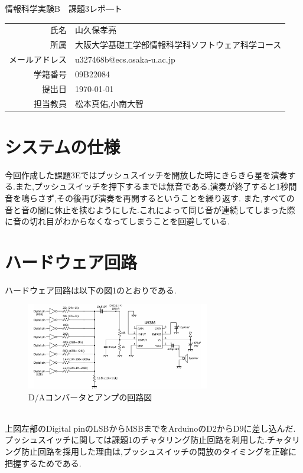 \documentclass[dvipdfmx]{jarticle}
\begin{document}
\begin{titlepage}
    \begin{center}
        {\huge 情報科学実験B　課題3レポ―ト}
        \vspace{180pt}\\
        \begin{tabular}{rl}
            氏名 & 山久保孝亮\\
            所属 & 大阪大学基礎工学部情報科学科ソフトウェア科学コース\\
            メールアドレス & u327468b@ecs.osaka-u.ac.jp\\
            学籍番号 & 09B22084\\
            提出日 & \today\\
            担当教員 & 松本真佑,小南大智
        \end{tabular}
    \end{center}
\end{titlepage}
\section{システムの仕様}
今回作成した課題3Eではプッシュスイッチを開放した時にきらきら星を演奏する.また,プッシュスイッチを押下するまでは無音である.演奏が終了すると1秒間音を鳴らさず,その後再び演奏を再開するということを繰り返す.
また,すべての音と音の間に休止を挟むようにした.これによって同じ音が連続してしまった際に音の切れ目がわからなくなってしまうことを回避している.
\section{ハードウェア回路}
ハードウェア回路は以下の図1のとおりである.\cite{0}
\begin{figure}[h]
    \centering
    \includegraphics[width=8cm]{kairo.png}
    \caption{D/Aコンバータとアンプの回路図}
\end{figure}
\\上図左部のDigital pinのLSBからMSBまでをArduinoのD2からD9に差し込んだ.
プッシュスイッチに関しては課題1のチャタリング防止回路を利用した.\cite{0}チャタリング防止回路を採用した理由は,プッシュスイッチの開放のタイミングを正確に把握するためである.
\end{document}
